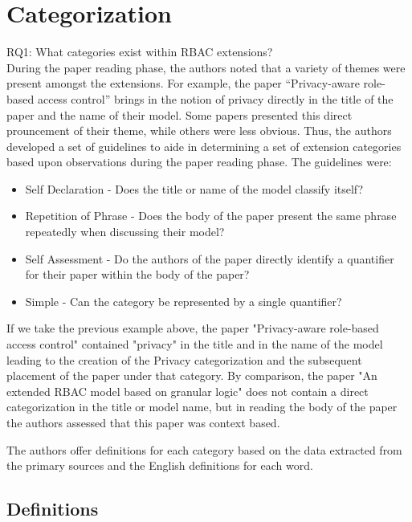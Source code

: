 \section{Categorization} \label{sec:categorization}

RQ1: What categories exist within RBAC extensions? \\

During the paper reading phase, the authors noted that a variety of themes were present amongst the extensions. 
For example, the paper ``Privacy-aware role-based access control'' \cite{ni2010privacy} brings in the notion of privacy directly in the title of the paper and the name of their model. 
Some papers presented this direct prouncement of their theme, while others were less obvious. 
Thus, the authors developed a set of guidelines to aide in determining a set of extension categories based upon observations during the paper reading phase. The guidelines were:

\begin{itemize}
\item Self Declaration - Does the title or name of the model classify itself?
\item Repetition of Phrase - Does the body of the paper present the same phrase repeatedly when discussing their model?
\item Self Assessment - Do the authors of the paper directly identify a quantifier for their paper within the body of the paper?
\item Simple - Can the category be represented by a single quantifier?
\end{itemize}

If we take the previous example above, the paper "Privacy-aware role-based access control" \cite{ni2010privacy} contained "privacy" in
the title and in the name of the model leading to the creation of the Privacy categorization and the subsequent placement of the paper under that category.
By comparison, the paper "An extended RBAC model based on granular logic" \cite{jian2008extended} does not contain a direct categorization in the title or model name, but in reading the body of the paper the authors assessed that this paper was context based.  

The authors offer definitions for each category based on the data extracted from the primary sources and the English definitions for each word.

\subsection{Definitions}

